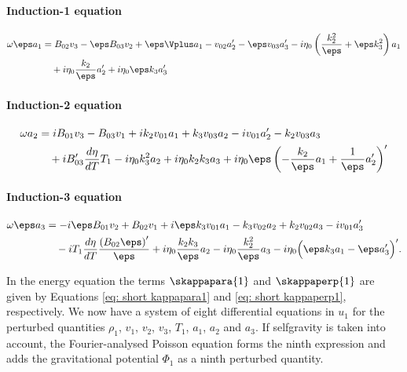 \paragraph{Induction-1 equation}
{\customEquationFont
\begin{equation} \label{eq: full_induction1}
  \begin{aligned}
    \omega \eps a_1 &=
      B_{02}v_3 - \eps B_{03}v_2
      + \eps\Vplus a_1  - v_{02}a_2' - \eps v_{03}a_3'
      - i \eta_0 \left(\frac{k_2^2}{\eps} + \eps k_3^2\right)a_1 \\
      &\quad
      + i \eta_0 \frac{k_2}{\eps} a_2' + i \eta_0 \eps k_3 a_3'
  \end{aligned}
\end{equation}
}

\paragraph{Induction-2 equation}
{\customEquationFont
\begin{equation} \label{eq: full_induction2}
  \begin{aligned}
    \omega a_2 &=
      i B_{01} v_3 - B_{03} v_1
      + i k_2 v_{01}a_1 + k_3 v_{03} a_2 - i v_{01} a_2' - k_2 v_{03} a_3 \\
      &\quad
      + i B_{03}' \frac{d\eta}{dT} T_1
      - i \eta_0 k_3^2 a_2
      + i \eta_0 k_2 k_3 a_3
      + i \eta_0\eps \left(- \frac{k_2}{\eps}a_1  + \frac{1}{\eps}a_2'\right)'
  \end{aligned}
\end{equation}
}

\paragraph{Induction-3 equation}
{\customEquationFont
\begin{equation} \label{eq: full_induction3}
  \begin{aligned}
    \omega \eps a_3 &=
    - i \eps B_{01} v_2 + B_{02} v_1
    + i \eps k_3 v_{01} a_1
    - k_3 v_{02} a_2
    + k_2 v_{02} a_3
    - i v_{01} a_3' \\
    &\quad
    - i T_1 \frac{d\eta}{dT} \frac{\left(B_{02} \eps\right)'}{\eps}
    + i \eta_0 \frac{k_2 k_3}{\eps} a_2
    - i \eta_0 \frac{k_2^2}{\eps}a_3
    - i \eta_0 \Bigl(\eps k_3 a_1 - \eps a_3'\Bigr)'.
  \end{aligned}
\end{equation}
}

In the energy equation the terms $\skappapara{1}$ and $\skappaperp{1}$ are given by Equations \eqref{eq: short kappapara1} and \eqref{eq: short kappaperp1}, respectively. We now have a system of eight differential equations in $u_1$ for the perturbed quantities $\rho_1$, $v_1$, $v_2$, $v_3$, $T_1$, $a_1$, $a_2$ and $a_3$. If selfgravity is taken into account, the Fourier-analysed Poisson equation forms the ninth expression and adds the gravitational potential $\Phi_1$ as a ninth perturbed quantity.

